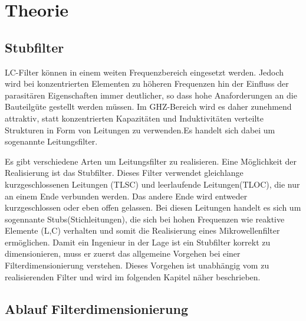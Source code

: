 \section{Theorie}

\subsection{Stubfilter}

LC-Filter können in einem weiten Frequenzbereich eingesetzt werden. Jedoch wird bei konzentrierten Elementen zu höheren Frequenzen hin der Einfluss der parasitären Eigenschaften immer deutlicher, so dass hohe Anaforderungen an die Bauteilgüte gestellt werden müssen. Im GHZ-Bereich wird es daher zunehmend attraktiv, statt konzentrierten Kapazitäten und Induktivitäten verteilte Strukturen in Form von Leitungen zu verwenden.Es handelt sich dabei um sogenannte Leitungsfilter.

Es gibt verschiedene Arten um Leitungsfilter zu realisieren. Eine Möglichkeit der Realisierung ist das Stubfilter. Dieses Filter verwendet gleichlange kurzgeschlossenen Leitungen (TLSC) und leerlaufende Leitungen(TLOC), die nur an einem Ende verbunden werden. Das andere Ende wird entweder kurzgeschlossen oder eben offen gelassen. Bei diesen Leitungen handelt es sich um sogennante Stubs(Stichleitungen), die sich bei hohen Frequenzen wie reaktive Elemente (L,C) verhalten und somit die Realisierung eines Mikrowellenfilter ermöglichen.
Damit ein Ingenieur in der Lage ist ein Stubfilter korrekt zu dimensionieren, muss er zuerst das allgemeine Vorgehen bei einer Filterdimensionierung verstehen. Dieses Vorgehen ist unabhängig vom zu realisierenden Filter und wird im folgenden Kapitel näher beschrieben.
 

\newpage


\subsection{Ablauf Filterdimensionierung}

